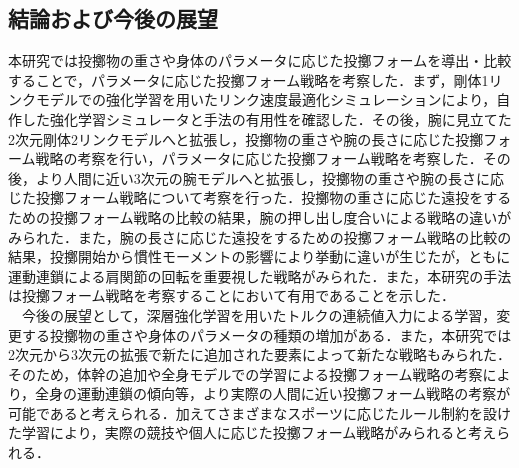 \begin{small}
\section{結論および今後の展望}
本研究では投擲物の重さや身体のパラメータに応じた投擲フォームを導出・比較することで，パラメータに応じた投擲フォーム戦略を考察した．まず，剛体1リンクモデルでの強化学習を用いたリンク速度最適化シミュレーションにより，自作した強化学習シミュレータと手法の有用性を確認した．その後，腕に見立てた2次元剛体2リンクモデルへと拡張し，投擲物の重さや腕の長さに応じた投擲フォーム戦略の考察を行い，パラメータに応じた投擲フォーム戦略を考察した．その後，より人間に近い3次元の腕モデルへと拡張し，投擲物の重さや腕の長さに応じた投擲フォーム戦略について考察を行った．投擲物の重さに応じた遠投をするための投擲フォーム戦略の比較の結果，腕の押し出し度合いによる戦略の違いがみられた．また，腕の長さに応じた遠投をするための投擲フォーム戦略の比較の結果，投擲開始から慣性モーメントの影響により挙動に違いが生じたが，ともに運動連鎖による肩関節の回転を重要視した戦略がみられた．また，本研究の手法は投擲フォーム戦略を考察することにおいて有用であることを示した．\\
　今後の展望として，深層強化学習を用いたトルクの連続値入力による学習，変更する投擲物の重さや身体のパラメータの種類の増加がある．また，本研究では2次元から3次元の拡張で新たに追加された要素によって新たな戦略もみられた．そのため，体幹の追加や全身モデルでの学習による投擲フォーム戦略の考察により，全身の運動連鎖の傾向等，より実際の人間に近い投擲フォーム戦略の考察が可能であると考えられる．加えてさまざまなスポーツに応じたルール制約を設けた学習により，実際の競技や個人に応じた投擲フォーム戦略がみられると考えられる．






{
\scriptsize %


}

\end{small}

